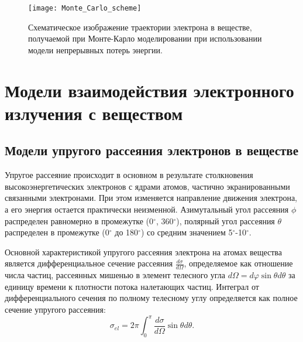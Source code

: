 \begin{figure}
	\centering
	\texttt{[image: Monte\_Carlo\_scheme]}
	\caption{Схематическое изображение траектории электрона в веществе, получаемой при Монте-Карло моделировании при использовании модели непрерывных потерь энергии.}
	\label{fig:Monte_Carlo_scheme}
\end{figure}



\section{Модели взаимодействия электронного излучения с веществом}

\subsection{Модели упругого рассеяния электронов в веществе}
Упругое рассеяние происходит в основном в результате столкновения высокоэнергетических электронов с ядрами атомов, частично экранированными связанными электронами. При этом изменяется направление движения электрона, а его энергия остается практически неизменной. Азимутальный угол рассеяния $\phi$ распределен равномерно в промежутке (0$^\circ$, 360$^\circ$), полярный угол рассеяния $\theta$ распределен в промежутке (0$^\circ$ до 180$^\circ$) со средним значением 5$^\circ$-10$^\circ$.

Основной характеристикой упругого рассеяния электрона на атомах вещества является дифференциальное сечение рассеяния $\frac{d \sigma}{d \Omega}$, определяемое как отношение числа частиц, рассеянных мишенью в элемент телесного угла $d \Omega = d \varphi \sin \theta d \theta$ за единицу времени к плотности потока налетающих частиц. Интеграл от дифференциального сечения по полному телесному углу определяется как полное сечение упругого рассеяния:
\begin{equation} \label{eq:models_1}
	\sigma_{el}=2 \pi \int_0^\pi \frac{d \sigma}{d \Omega} \sin \theta d \theta.
\end{equation}

